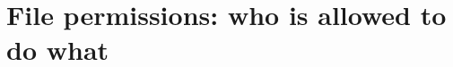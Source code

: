 \chapter{File permissions: who is allowed to do what}
\label{ch:file-permissions-who-is-allowed-to-do}

